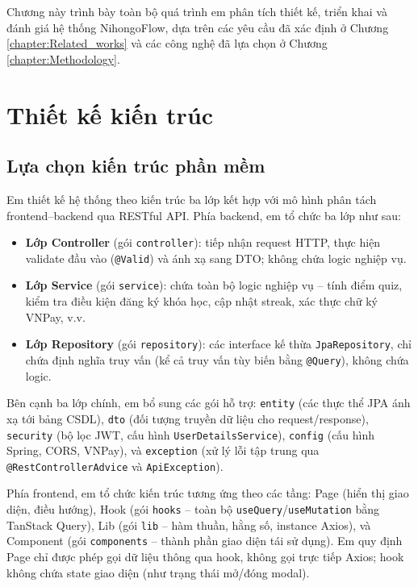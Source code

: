 \documentclass[../DoAn.tex]{subfiles}
\begin{document}
Chương này trình bày toàn bộ quá trình em phân tích thiết kế, triển khai và đánh giá hệ thống NihongoFlow, dựa trên các yêu cầu đã xác định ở Chương \ref{chapter:Related_works} và các công nghệ đã lựa chọn ở Chương \ref{chapter:Methodology}.

\section{Thiết kế kiến trúc}

\subsection{Lựa chọn kiến trúc phần mềm}
\label{subsection:4.1.1}

Em thiết kế hệ thống theo kiến trúc ba lớp kết hợp với mô hình phân tách frontend--backend qua RESTful API. Phía backend, em tổ chức ba lớp như sau:

\begin{itemize}
    \item \textbf{Lớp Controller} (gói \texttt{controller}): tiếp nhận request HTTP, thực hiện validate đầu vào (\texttt{@Valid}) và ánh xạ sang DTO; không chứa logic nghiệp vụ.
    \item \textbf{Lớp Service} (gói \texttt{service}): chứa toàn bộ logic nghiệp vụ -- tính điểm quiz, kiểm tra điều kiện đăng ký khóa học, cập nhật streak, xác thực chữ ký VNPay, v.v.
    \item \textbf{Lớp Repository} (gói \texttt{repository}): các interface kế thừa \texttt{JpaRepository}, chỉ chứa định nghĩa truy vấn (kể cả truy vấn tùy biến bằng \texttt{@Query}), không chứa logic.
\end{itemize}

Bên cạnh ba lớp chính, em bổ sung các gói hỗ trợ: \texttt{entity} (các thực thể JPA ánh xạ tới bảng CSDL), \texttt{dto} (đối tượng truyền dữ liệu cho request/response), \texttt{security} (bộ lọc JWT, cấu hình \texttt{UserDetailsService}), \texttt{config} (cấu hình Spring, CORS, VNPay), và \texttt{exception} (xử lý lỗi tập trung qua \texttt{@RestControllerAdvice} và \texttt{ApiException}).

Phía frontend, em tổ chức kiến trúc tương ứng theo các tầng: Page (hiển thị giao diện, điều hướng), Hook (gói \texttt{hooks} -- toàn bộ \texttt{useQuery}/\texttt{useMutation} bằng TanStack Query), Lib (gói \texttt{lib} -- hàm thuần, hằng số, instance Axios), và Component (gói \texttt{components} -- thành phần giao diện tái sử dụng). Em quy định Page chỉ được phép gọi dữ liệu thông qua hook, không gọi trực tiếp Axios; hook không chứa state giao diện (như trạng thái mở/đóng modal).
\end{document}
